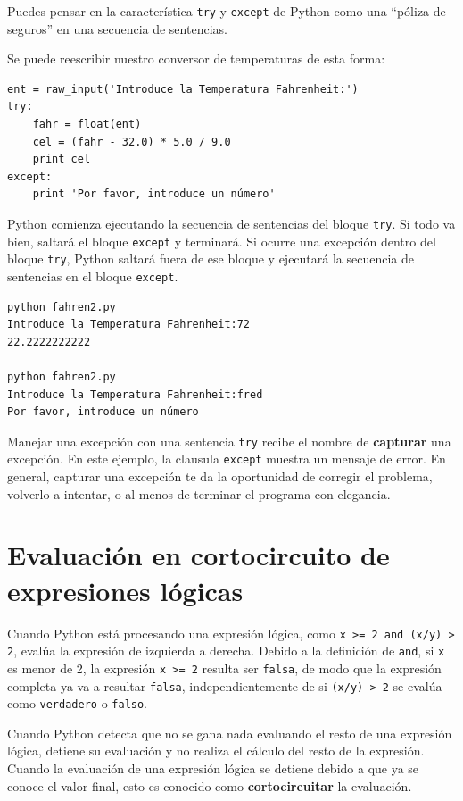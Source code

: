 Puedes pensar en la característica {\tt try} y {\tt except}
de Python como una ``póliza de seguros'' en una secuencia
de sentencias.

Se puede reescribir nuestro conversor de temperaturas de esta forma:

\beforeverb
\begin{verbatim}
ent = raw_input('Introduce la Temperatura Fahrenheit:')
try:
    fahr = float(ent)
    cel = (fahr - 32.0) * 5.0 / 9.0
    print cel
except:
    print 'Por favor, introduce un número'
\end{verbatim}
\afterverb
%

Python comienza ejecutando la
secuencia de sentencias del bloque
{\tt try}. Si todo va bien,
saltará el bloque {\tt except} y terminará.
Si ocurre una excepción dentro del bloque {\tt try},
Python saltará fuera de ese bloque y
ejecutará la secuencia de sentencias en el bloque {\tt except}.

\beforeverb
\begin{verbatim}
python fahren2.py 
Introduce la Temperatura Fahrenheit:72
22.2222222222

python fahren2.py 
Introduce la Temperatura Fahrenheit:fred
Por favor, introduce un número
\end{verbatim}
\afterverb
%

Manejar una excepción con una sentencia {\tt try} recibe el nombre de
{\bf capturar} una excepción. En este ejemplo, la clausula {\tt except}
muestra un mensaje de error. En general,
capturar una excepción te da la oportunidad de corregir el problema,
volverlo a intentar, o al menos de terminar el programa con elegancia.

\section{Evaluación en cortocircuito de expresiones lógicas}

Cuando Python está procesando una expresión lógica, como
{\tt x >= 2 and (x/y) > 2}, evalúa la expresión de
izquierda a derecha. Debido a la definición de {\tt and},
si {\tt x} es menor de 2, la expresión {\tt x >= 2} resulta ser
{\tt falsa}, de modo que la expresión completa ya va a resultar {\tt falsa}, independientemente
de si {\tt (x/y) > 2} se evalúa como {\tt verdadero} o {\tt falso}.

Cuando Python detecta que no se gana nada evaluando
el resto de una expresión lógica, detiene su evaluación y no
realiza el cálculo del resto de la expresión.
Cuando la evaluación de una expresión lógica se detiene debido a que
ya se conoce el valor final, esto es conocido como {\bf cortocircuitar}
la evaluación.

